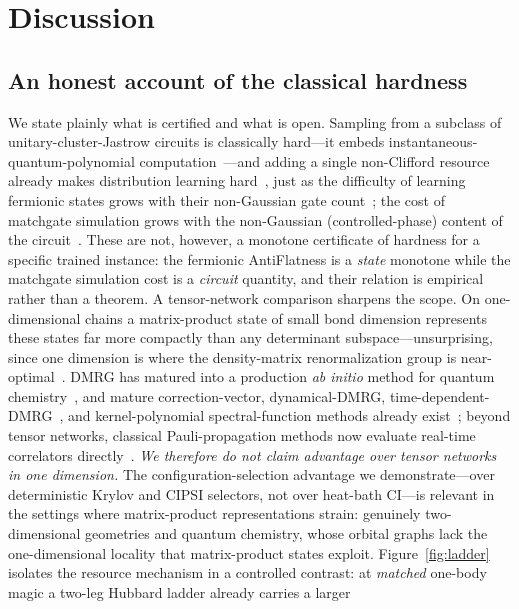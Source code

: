 \section{Discussion}\label{sec:honest}

\subsection{An honest account of the classical hardness}
We state plainly what is certified and what is open. Sampling from a subclass of unitary-cluster-Jastrow
circuits is classically hard---it embeds instantaneous-quantum-polynomial
computation~\cite{bremner2016,hafid2025}---and adding a single non-Clifford resource already makes
distribution learning hard~\cite{hinsche2023}, just as the difficulty of learning fermionic
states grows with their non-Gaussian gate count~\cite{melehera2025}; the cost of matchgate simulation grows with the
non-Gaussian (controlled-phase) content of the circuit~\cite{extraferm}. These are
not, however, a monotone certificate of hardness for a specific trained instance: the fermionic
AntiFlatness is a \emph{state} monotone while the matchgate simulation cost is a \emph{circuit}
quantity, and their relation is empirical rather than a theorem. A tensor-network comparison
sharpens the scope. On one-dimensional chains a matrix-product state of small bond dimension
represents these states far more compactly than any determinant subspace---unsurprising, since one
dimension is where the density-matrix renormalization group is near-optimal~\cite{schollwock2011}. DMRG has
matured into a production \emph{ab initio} method for quantum chemistry~\cite{chanheadgordon2002,block2},
and mature correction-vector, dynamical-DMRG, time-dependent-DMRG~\cite{paeckel2019}, and kernel-polynomial
spectral-function methods already
exist~\cite{kuehner1999,jeckelmann2002,holzner2011,nocera2016,whitefeiguin2004,kpm2006};
beyond tensor networks, classical Pauli-propagation methods now evaluate real-time correlators
directly~\cite{kemper2026}.
\emph{We therefore do not claim advantage over tensor networks in one dimension.} The
configuration-selection advantage we demonstrate---over deterministic Krylov and CIPSI selectors, not
over heat-bath CI---is relevant in the settings where matrix-product representations strain: genuinely
two-dimensional geometries and quantum chemistry, whose orbital graphs lack the one-dimensional locality
that matrix-product states exploit. Figure~\ref{fig:ladder} isolates the resource mechanism in a
controlled contrast: at \emph{matched} one-body magic a two-leg Hubbard ladder already carries a larger
